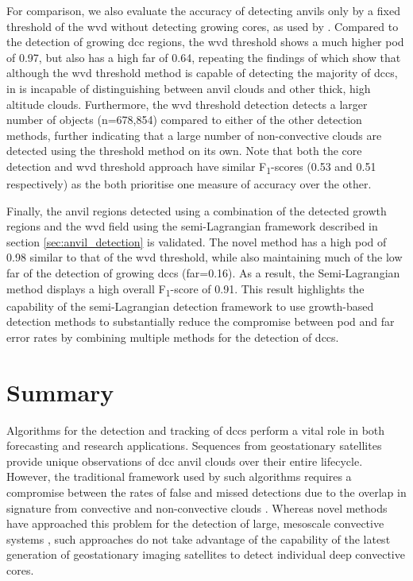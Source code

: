 For comparison, we also evaluate the accuracy of detecting anvils only by a fixed threshold of the \acrshort{wvd} without detecting growing cores, as used by \citet{muller_role_2018}.
Compared to the detection of growing \acrshort{dcc} regions, the \acrshort{wvd} threshold shows a much higher \acrshort{pod} of 0.97, but also has a high \acrshort{far} of 0.64, repeating the findings of \citet{muller_novel_2019} which show that although the \acrshort{wvd} threshold method is capable of detecting the majority of \acrshort{dcc}s, in is incapable of distinguishing between anvil clouds and other thick, high altitude clouds.
Furthermore, the \acrshort{wvd} threshold detection detects a larger number of objects (n=678,854) compared to either of the other detection methods, further indicating that a large number of non-convective clouds are detected using the threshold method on its own.
Note that both the core detection and \acrshort{wvd} threshold approach have similar F\textsubscript{1}-scores (0.53 and 0.51 respectively) as the both prioritise one measure of accuracy over the other.

Finally, the anvil regions detected using a combination of the detected growth regions and the \acrshort{wvd} field using the semi-Lagrangian framework described in section \ref{sec:anvil_detection} is validated.
The novel method has a high \acrshort{pod} of 0.98 similar to that of the \acrshort{wvd} threshold, while also maintaining much of the low \acrshort{far} of the detection of growing \acrshort{dcc}s (\acrshort{far}=0.16).
As a result, the Semi-Lagrangian method displays a high overall F\textsubscript{1}-score of 0.91.
This result highlights the capability of the semi-Lagrangian detection framework to use growth-based detection methods to substantially reduce the compromise between \acrshort{pod} and \acrshort{far} error rates by combining multiple methods for the detection of \acrshort{dcc}s.


\section{Summary}  %

Algorithms for the detection and tracking of \acrshort{dcc}s perform a vital role in both forecasting and research applications.
Sequences from geostationary satellites provide unique observations of \acrshort{dcc} anvil clouds over their entire lifecycle.
However, the traditional framework used by such algorithms requires a compromise between the rates of false and missed detections due to the overlap in signature from convective and non-convective clouds \citep{konduru_new_2013}.
Whereas novel methods have approached this problem for the detection of large, mesoscale convective systems \citep{fiolleau_algorithm_2013}, such approaches do not take advantage of the capability of the latest generation of geostationary imaging satellites to detect individual deep convective cores.

